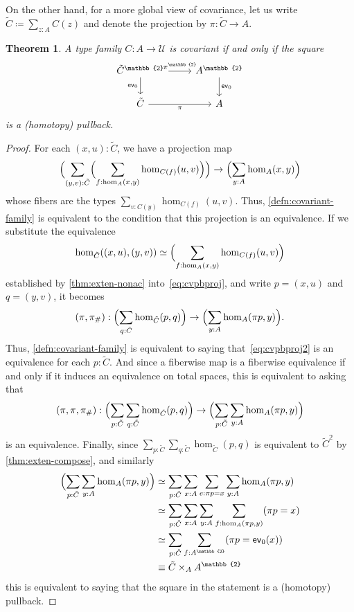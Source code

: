 \documentclass{amsart}
\theoremstyle{plain}
\newtheorem{thm}{Theorem}[section]
\theoremstyle{definition}
\theoremstyle{remark}
\numberwithin{equation}{section}
\newcommand{\extfn}[1]{{#1}_\#}
\newcommand{\jdeq}{\equiv}
\newcommand{\defeq}{\coloneqq}
\newcommand{\univtype}{\mathcal{U}}
\newcommand{\two}{\mathbb{2}}
\newcommand{\Parens}[1]{\Bigl(#1\Bigr)}
\begin{document}
On the other hand, for a more global view of covariance, let us write $\tilde C \defeq {\sum_{z:A} C(z)}$ and denote the projection by $\pi : \tilde C \to A$.

\begin{thm}\label{thm:covariance-as-pullback} A type family  $C : A \to \univtype$ is covariant if and only if the square
\[ 
\begin{tikzcd}
 \tilde C^\two \arrow[r, "{\pi^\two}"] \arrow[d, "{\mathsf{ev}_0}"'] &
  A^\two \arrow[d, "{\mathsf{ev}_0}"] \\
  \tilde C \arrow[r, "\pi"'] &
  A 
  \end{tikzcd}\]
is a (homotopy) pullback.
\end{thm}
\begin{proof}
For each $(x,u) : \tilde C$, we have a projection map
\begin{equation}
  \Parens{\sum_{(y,v):\tilde C} \Parens{\sum_{f:\hom_A(x,y)} \hom_{C(f)}(u,v)}} \to \Parens{\sum_{y:A} \hom_A(x, y)}\label{eq:cvpbproj}
\end{equation}
whose fibers are the types $\sum_{v:C(y)} \hom_{C(f)}(u,v)$.
Thus, \cref{defn:covariant-family} is equivalent to the condition that this projection is an equivalence.
If we substitute the equivalence  \[\hom_{\tilde C}((x,u),(y,v)) \simeq \Parens{\sum_{f:\hom_A(x,y)} \hom_{C(f)}(u,v)}\]
established by \cref{thm:exten-nonac} into~\eqref{eq:cvpbproj}, and write $p=(x,u)$ and $q=(y,v)$, it becomes
\begin{equation}
  (\pi,\extfn\pi) : \Parens{\sum_{q:\tilde C} \hom_{\tilde C}(p,q)} \to \Parens{\sum_{y:A} \hom_A(\pi p, y)}.\label{eq:cvpbproj2}
\end{equation}
Thus, \cref{defn:covariant-family} is equivalent to saying that~\eqref{eq:cvpbproj2} is an equivalence for each $p:\tilde{C}$.
And since a fiberwise map is a fiberwise equivalence if and only if it induces an equivalence on total spaces, this is equivalent to asking that
\[ (\pi,\pi,\extfn\pi) : \Parens{\sum_{p : \tilde C} \sum_{q:\tilde C} \hom_{\tilde C}(p,q)} \to \Parens{\sum_{p : \tilde C}\sum_{y : A} \hom_A(\pi p, y)}\]
is an equivalence.
Finally, since $\sum_{p : \tilde C} \sum_{q:\tilde C} \hom_{\tilde C}(p,q)$ is equivalent to $\tilde C^\two$ by \cref{thm:exten-compose}, and similarly
\begin{align*}
  \Parens{\sum_{p : \tilde C}\sum_{y : A} \hom_A(\pi p, y)}
  &\simeq \sum_{p : \tilde C}\sum_{x:A} \sum_{e:\pi p=x}\sum_{y : A} \hom_A(\pi p, y)\\
  &\simeq \sum_{p : \tilde C}\sum_{x:A}\sum_{y : A}\sum_{f:\hom_A(\pi p, y)} (\pi p=x)\\
  &\simeq \sum_{p : \tilde C} \sum_{f:A^\two} (\pi p=\mathsf{ev}_0(x))\\
  &\jdeq \tilde C \times_{A} A^\two
\end{align*}
this is equivalent to saying that the square in the statement is a (homotopy) pullback.
\end{proof}
\end{document}
